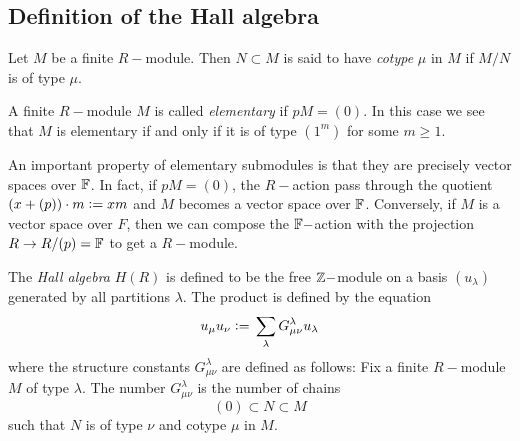\subsection{Definition of the Hall algebra}
\begin{dang}
    \begin{definition}\cite{macdonald1998symmetric}
        Let $M$ be a finite $R-$module. Then $N\subset M$ is said to have \textit{cotype} $\mu$ in $M$ if $M/N$ is of type $\mu$.
    \end{definition}
\end{dang}
\begin{dang}
\begin{definition}\cite{macdonald1998symmetric}
     A finite $R-$module $M$ is called \textit{elementary} if $pM=(0)$. In this case we see that $M$ is elementary if and only if it is of type $(1^m)$ for some $m\geq1$.
\end{definition}
\end{dang}
An important property of elementary submodules is that they are precisely vector spaces over $\mathbb{F}$. In fact, if $pM=(0)$, the $R-$action pass through the quotient $(x+(p))\cdot m \bydef xm$ and $M$ becomes a vector space over $\mathbb{F}$. Conversely, if $M$ is a vector space over $F$, then we can compose the $\mathbb{F}-$action with the projection $R\rightarrow R/(p)=\mathbb{F}$ to get a $R-$module. 
\begin{dang}
    \begin{definition}\cite{macdonald1998symmetric}
        The \textit{Hall algebra} $H(R)$ is defined to be the free $\mathbb{Z}-$module on a basis $(u_\lambda)$ generated by all partitions $\lambda$. The product is defined by the equation 
        \begin{equation}
            u_\mu u_\nu\bydef\sum_\lambda G_{\mu\nu}^\lambda u_\lambda
        \end{equation}
        where the structure constants $G_{\mu\nu}^\lambda$ are defined as follows: Fix a finite $R-$module $M$ of type $\lambda$. The number $G_{\mu\nu}^\lambda$ is the number of chains
        \begin{equation}
            (0)\subset N\subset M
        \end{equation}
        such that $N$ is of type $\nu$ and cotype $\mu$ in $M$.
    \end{definition}
\end{dang}
